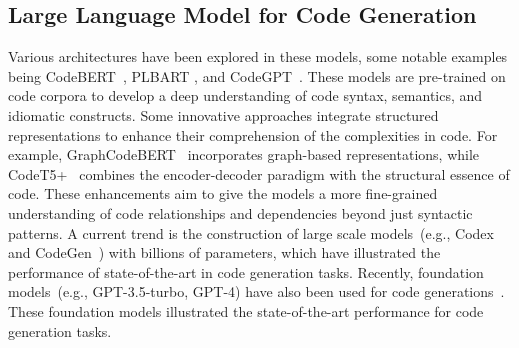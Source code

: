 \documentclass{article}
\begin{document}
\subsection{Large Language Model for Code Generation}
Various architectures have been explored in these models, some notable examples being CodeBERT~\cite{codebert}, PLBART \cite{Ahmad2021UnifiedPF}, and CodeGPT~\cite{CERT}. These models are pre-trained on code corpora to develop a deep understanding of code syntax, semantics, and idiomatic constructs. Some innovative approaches integrate structured representations to enhance their comprehension of the complexities in code. For example, GraphCodeBERT~\cite{Guo2020GraphCodeBERTPC} incorporates graph-based representations, while CodeT5+~\cite{wang2023codet5+} combines the encoder-decoder paradigm with the structural essence of code. These enhancements aim to give the models a more fine-grained understanding of code relationships and dependencies beyond just syntactic patterns. A current trend is the construction of large scale models~(e.g.,  Codex~\cite{chen2021evaluating} and CodeGen~\cite{nijkamp2022codegen}) with billions of parameters, which have illustrated the performance of state-of-the-art in code generation tasks. Recently, foundation models~(e.g., GPT-3.5-turbo, GPT-4) have also been used for code generations~\cite{Madaan2023SelfRefineIR,Huang2023CodeCoTAB}. These foundation models illustrated the state-of-the-art performance for code generation tasks.
 
\end{document}
